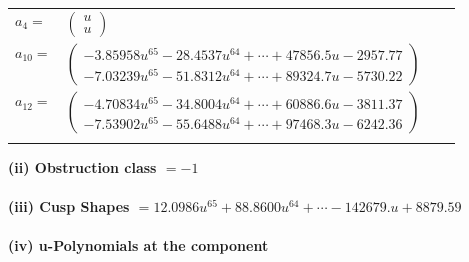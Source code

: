 \documentclass[1p]{elsarticle_modified}
\theoremstyle{definition}
\begin{document}
\begin{tabular}{m{7pt} m{180pt} m{7pt} m{180pt} }
\flushright $a_{4}=$&$\begin{pmatrix}u\\u\end{pmatrix}$ \\
\flushright $a_{10}=$&$\begin{pmatrix}-3.85958 u^{65}-28.4537 u^{64}+\cdots+47856.5 u-2957.77\\-7.03239 u^{65}-51.8312 u^{64}+\cdots+89324.7 u-5730.22\end{pmatrix}$ \\
\flushright $a_{12}=$&$\begin{pmatrix}-4.70834 u^{65}-34.8004 u^{64}+\cdots+60886.6 u-3811.37\\-7.53902 u^{65}-55.6488 u^{64}+\cdots+97468.3 u-6242.36\end{pmatrix}$\\&\end{tabular}
\flushleft \textbf{(ii) Obstruction class $= -1$}\\~\\
\flushleft \textbf{(iii) Cusp Shapes $= 12.0986 u^{65}+88.8600 u^{64}+\cdots-142679. u+8879.59$}\\~\\
\newpage\renewcommand{\arraystretch}{1}
\flushleft \textbf{(iv) u-Polynomials at the component}\newline \\
\end{document}
